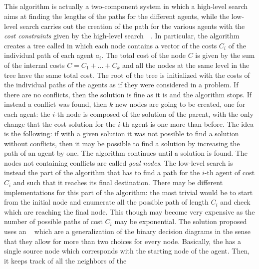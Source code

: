 \subsection{}
This algorithm is actually a two-component system in which a high-level search
aims at finding the lengths of the paths for the different agents, while the 
low-level search carries out the creation of the path for the various
agents with the \textit{cost constraints} given by the high-level 
search~\cite{MAPF_overview}~\cite{ICTS}. \newline
In particular, the algorithm creates a tree called  in which each 
node contains a vector of the costs $C_i$ of the individual path of each agent
$a_i$. The total cost of the node $C$ is given by the sum of the internal costs
$C=C_1+\hdots+C_k$ and all the nodes at the same level in the tree have the
same total cost. \newline
The root of the tree is initialized with the costs of the individual paths of
the agents as if they were considered in a  problem. If there are no
conflicts, then the solution is fine as it is and the algorithm stops. If 
instead a conflict was found, then $k$ new nodes are going to be created, one 
for each agent: the $i$-th node is composed of the solution of the parent, with
the only change that the cost solution for the $i$-th agent is one more than
before. The idea is the following: if with a given solution it was not possible
to find a solution without conflicts, then it may be possible to find a
solution by increasing the path of an agent by one. The algorithm continues 
until a solution is found. The  nodes not containing conflicts are 
called \textit{goal nodes}. \newline
The low-level search is instead the part of the algorithm that has to find a
path for the $i$-th agent of cost $C_i$ and such that it reaches its final
destination. There may be different implementations for this part of the
algorithm: the most trivial would be to start from the initial node and
enumerate all the possible path of length $C_i$ and check which are reaching
the final node. This though may become very expensive as the number of possible
paths of cost $C_i$ may be exponential. The solution proposed~\cite{ICTS} uses
an ~\cite{MDD} which are a generalization of the binary decision
diagrams in the sense that they allow for more than two choices for every node.
Basically, the  has a single source node which corresponds with the
starting node of the agent. Then, it keeps track of all the neighbors of the
